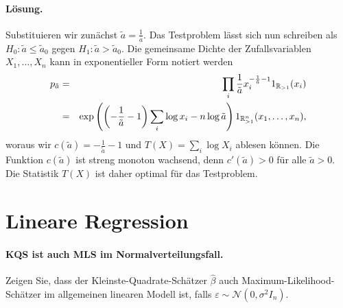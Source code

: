 \paragraph*{Lösung. } Substituieren wir zunächst $\tilde a = \frac{1}{a}$. Das Testproblem lässt sich
nun schreiben als $H_0: \tilde a \leq \tilde a_0$ gegen $H_1: \tilde a > \tilde a_0$. Die gemeinsame
Dichte der Zufallsvariablen $X_1,\ldots,X_n$ kann in exponentieller Form notiert werden
\begin{eqnarray}
    p_{\tilde a} &=& \prod_i \frac{1}{\tilde a} x_i^{ -\frac{1}{\tilde a} -1 } 1_{\mathbb R_{>1}}(x_i) \\
    &=& \exp \left( \left( -\frac{1}{\tilde a} -1 \right) \sum_{i}^{}\log x_i
    -n \log \tilde a \right) 1_{\mathbb R_{>1}^n}(x_1,\ldots,x_n), \\
\end{eqnarray}
woraus wir $c(\tilde a)=-\frac{1}{\tilde a} -1$ und $T(X)= \sum_{i}^{} \log X_i$ ablesen können.
Die Funktion $c(\tilde a)$ ist streng monoton wachsend, denn $c'(\tilde a ) >0$ für alle $\tilde a>0$. 
Die Statistik $T(X)$ ist daher optimal für das Testproblem. 




\section{Lineare Regression}



\paragraph{KQS ist auch MLS im Normalverteilungsfall. }
Zeigen Sie, dass der Kleinste-Quadrate-Schätzer $\hat \beta$ auch Maximum-Likelihood-Schätzer 
im allgemeinen linearen Modell ist, falls $\varepsilon \sim \mathcal N(0, \sigma^2 I_n)$.

